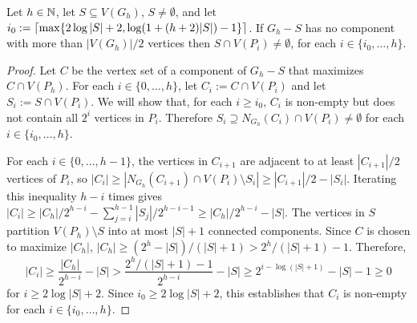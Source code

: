 \documentclass{patmorin}
\renewcommand{\ge}{\geqslant}
\begin{document}
\begin{lem}\label{small_depth_separator}
  Let $h\in\mathbb{N}$, let $S\subseteq V(G_h)$, $S\neq\emptyset$, and let $i_0:={\lceil \max\{2\log|S|+2, \log(1+(h+2)|S|)-1\} \rceil}$.  If $G_h-S$ has no component with more than $|V(G_h)|/2$ vertices then $S\cap V(P_i)\neq\emptyset$, for each $i\in\{i_0,\ldots,h\}$.
\end{lem}

\begin{proof}
  Let $C$ be the vertex set of a component of $G_h-S$ that maximizes $C\cap V(P_h)$. For each $i\in\{0,\ldots,h\}$, let $C_i:=C\cap V(P_i)$ and let $S_i:=S\cap V(P_i)$. We will show that, for each $i\ge i_0$, $C_i$ is non-empty but does not contain all $2^i$ vertices in $P_i$.  Therefore $S_i\supseteq N_{G_h}(C_i)\cap V(P_i)\neq\emptyset$ for each $i\in\{i_0,\ldots,h\}$.

  For each $i\in\{0,\ldots,h-1\}$, the vertices in $C_{i+1}$ are adjacent to at least $|C_{i+1}|/2$ vertices of $P_{i}$, so $|C_i|\ge |N_{G_h}(C_{i+1})\cap V(P_i)\setminus S_i| \ge |C_{i+1}|/2 - |S_i|$.  Iterating this inequality $h-i$ times gives $|C_i|\ge |C_h|/2^{h-i}-\sum_{j=i}^{h-1}|S_j|/2^{h-i-1}\ge |C_h|/2^{h-i}-|S|$.  The vertices in $S$ partition $V(P_h)\setminus S$ into at most $|S|+1$ connected components.  Since $C$ is chosen to maximize $|C_h|$, $|C_h| \ge (2^h-|S|)/(|S|+1) > 2^{h}/(|S|+1) - 1$.  Therefore,
  \begin{equation}
    |C_i|\ge \frac{|C_h|}{2^{h-i}} - |S| > \frac{2^h/(|S|+1)-1}{2^{h-i}} - |S|
    \ge 2^{i-\log(|S|+1)}-|S|-1 \ge 0
  \end{equation}
  for $i\ge 2\log |S|+2$.  Since $i_0\ge 2\log |S|+2$, this establishes that $C_i$ is non-empty for each $i\in\{i_0,\ldots,h\}$.


\end{proof}
\end{document}

